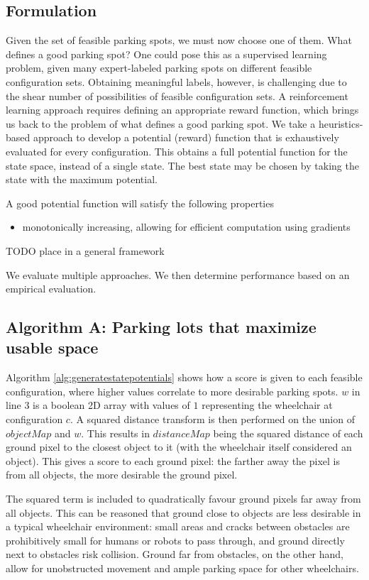\subsection{Formulation}
Given the set of feasible parking spots, we must now choose one of them. What
defines a good parking spot? One could pose this as a supervised learning
problem, given many expert-labeled parking spots on different feasible
configuration sets.  Obtaining meaningful labels, however, is challenging due to
the shear number of possibilities of feasible configuration sets. A
reinforcement learning approach requires defining an appropriate reward
function, which brings us back to the problem of what defines a good parking
spot. We take a heuristics-based approach to develop a potential (reward)
function that is exhaustively evaluated for every configuration.
This obtains a full potential function for the state space, instead of a single
state. The best state may be chosen by taking the state with the maximum
potential.

A good potential function will satisfy the following properties
\begin{itemize}
\item monotonically increasing, allowing for efficient computation
using gradients
\end{itemize}

TODO place in a general framework

We evaluate multiple approaches. We then determine performance based on an
empirical evaluation.

\subsection{Algorithm A: Parking lots that maximize usable space}
Algorithm \autoref{alg:generatestatepotentials} shows how a score is given to each
feasible configuration, where higher values correlate to more desirable parking
spots. $w$ in line 3 is a boolean 2D array with values of $1$ representing the
wheelchair at configuration $c$. A squared distance transform is then performed
on the union of $objectMap$ and $w$. This results in $distanceMap$ being the
squared distance of each ground pixel to the closest object to it (with the
wheelchair itself considered an object). This gives a score to each ground pixel:
the farther away the pixel is from all objects, the more desirable the ground
pixel. 

The squared term is included to quadratically favour ground pixels far
away from all objects. This can be reasoned that ground close to objects are less
desirable in a typical wheelchair environment: small areas and cracks between
obstacles are prohibitively small for humans or robots to pass through, and
ground directly next to obstacles risk collision. Ground far from obstacles, on
the other hand, allow for unobstructed movement and ample parking space for
other wheelchairs.


